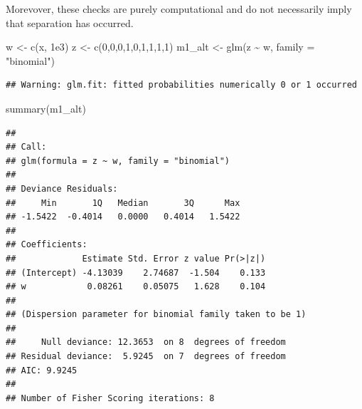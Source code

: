 \documentclass[
  ignorenonframetext,
]{beamer}
\newenvironment{Shaded}{\begin{snugshade}}{\end{snugshade}}
\newcommand{\AttributeTok}[1]{\textcolor[rgb]{0.77,0.63,0.00}{#1}}
\newcommand{\DecValTok}[1]{\textcolor[rgb]{0.00,0.00,0.81}{#1}}
\newcommand{\FloatTok}[1]{\textcolor[rgb]{0.00,0.00,0.81}{#1}}
\newcommand{\FunctionTok}[1]{\textcolor[rgb]{0.00,0.00,0.00}{#1}}
\newcommand{\NormalTok}[1]{#1}
\newcommand{\OtherTok}[1]{\textcolor[rgb]{0.56,0.35,0.01}{#1}}
\newcommand{\SpecialCharTok}[1]{\textcolor[rgb]{0.00,0.00,0.00}{#1}}
\newcommand{\StringTok}[1]{\textcolor[rgb]{0.31,0.60,0.02}{#1}}
\begin{document}
\begin{frame}[fragile]{}
\protect\hypertarget{section-4}{}
Morevover, these checks are purely computational and do not necessarily
imply that separation has occurred.

\vspace{12pt}
\tiny

\begin{Shaded}
\begin{Highlighting}[]
\NormalTok{w }\OtherTok{\textless{}{-}} \FunctionTok{c}\NormalTok{(x, }\FloatTok{1e3}\NormalTok{)}
\NormalTok{z }\OtherTok{\textless{}{-}} \FunctionTok{c}\NormalTok{(}\DecValTok{0}\NormalTok{,}\DecValTok{0}\NormalTok{,}\DecValTok{0}\NormalTok{,}\DecValTok{1}\NormalTok{,}\DecValTok{0}\NormalTok{,}\DecValTok{1}\NormalTok{,}\DecValTok{1}\NormalTok{,}\DecValTok{1}\NormalTok{,}\DecValTok{1}\NormalTok{)}
\NormalTok{m1\_alt }\OtherTok{\textless{}{-}} \FunctionTok{glm}\NormalTok{(z }\SpecialCharTok{\textasciitilde{}}\NormalTok{ w, }\AttributeTok{family =} \StringTok{"binomial"}\NormalTok{)}
\end{Highlighting}
\end{Shaded}

\begin{verbatim}
## Warning: glm.fit: fitted probabilities numerically 0 or 1 occurred
\end{verbatim}

\begin{Shaded}
\begin{Highlighting}[]
\FunctionTok{summary}\NormalTok{(m1\_alt)}
\end{Highlighting}
\end{Shaded}

\begin{verbatim}
## 
## Call:
## glm(formula = z ~ w, family = "binomial")
## 
## Deviance Residuals: 
##     Min       1Q   Median       3Q      Max  
## -1.5422  -0.4014   0.0000   0.4014   1.5422  
## 
## Coefficients:
##             Estimate Std. Error z value Pr(>|z|)
## (Intercept) -4.13039    2.74687  -1.504    0.133
## w            0.08261    0.05075   1.628    0.104
## 
## (Dispersion parameter for binomial family taken to be 1)
## 
##     Null deviance: 12.3653  on 8  degrees of freedom
## Residual deviance:  5.9245  on 7  degrees of freedom
## AIC: 9.9245
## 
## Number of Fisher Scoring iterations: 8
\end{verbatim}
\end{frame}
\end{document}
